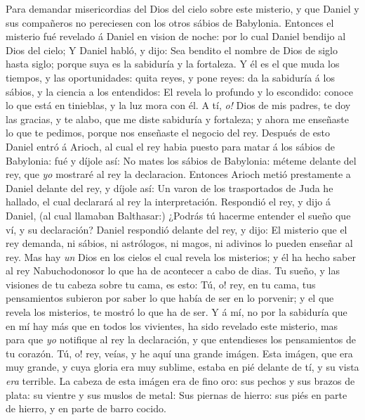 \bverse Para demandar misericordias del
  Dios del cielo sobre este misterio, y que
  Daniel y sus compañeros no pereciesen
  con los otros sábios de Babylonia.
\bverse Entonces el misterio fué revelado á 
  Daniel en vision de noche: por lo cual
  Daniel bendijo al Dios del cielo;
\bverse Y Daniel habló, y dijo: Sea bendito
  el nombre de Dios de siglo hasta siglo;
  porque suya es la sabiduría y la fortaleza.
\bverse Y él es el que muda los tiempos, y
  las oportunidades: quita reyes, y pone
  reyes: da la sabiduría á los sábios, y la 
  ciencia a los entendidos:
\bverse El revela lo profundo y lo escondido:
  conoce lo que está en tinieblas, y la
  luz mora con él.
\bverse A tí, \emph{o!} Dios de mis padres, te doy
  las gracias, y te alabo, que me diste
  sabiduría y fortaleza; y ahora me enseñaste
  lo que te pedimos, porque nos enseñaste
  el negocio del rey.
\bverse Después de esto Daniel entró á Arioch,
  al cual el rey habia puesto para
  matar á los sábios de Babylonia: fué y
  díjole así: No mates los sábios de 
  Babylonia: méteme delante del rey, que \emph{yo} 
  mostraré al rey la declaracion.
\bverse Entonces Arioch metió prestamente
  a Daniel delante del rey, y díjole así:
  Un varon de los trasportados de Juda he
  hallado, el cual declarará al rey la
  interpretación.
\bverse Respondió el rey, y dijo á Daniel,
  (al cual llamaban Balthasar:) ¿Podrás tú 
  hacerme entender el sueño que ví,
  y su declaración?
\bverse Daniel respondió delante del rey, y
  dijo: El misterio que el rey demanda, ni
  sábios, ni astrólogos, ni magos, ni
  adivinos lo pueden enseñar al rey.
\bverse Mas hay \emph{un} Dios en los cielos el cual
  revela los misterios; y él ha hecho saber
  al rey Nabuchodonosor lo que ha de 
  acontecer a cabo de dias. Tu sueño, y 
  las visiones de tu cabeza sobre tu cama,
  es esto:
\bverse Tú, o! rey, en tu cama, tus
  pensamientos subieron por saber lo que había
  de ser en lo porvenir; y el que revela
  los misterios, te mostró lo que ha de ser.
\bverse Y á mí, no por la sabiduría que en
  mí hay más que en todos los vivientes,
  ha sido revelado este misterio, mas para
  que \emph{yo} notifique al rey la declaración, y
  que entendieses los pensamientos de tu
  corazón.
\bverse Tú, o! rey, veías, y he aquí una grande imágen.
  Esta imágen, que era muy 
  grande, y cuya gloria era muy sublime,
  estaba en pié delante de tí, y su vista \emph{era}
  terrible.
\bverse La cabeza de esta imágen era de fino oro:
  sus pechos y sus brazos de plata:
  su vientre y sus muslos de metal:
\bverse Sus piernas de hierro: sus piés en
  parte de hierro, y en parte de barro cocido.
